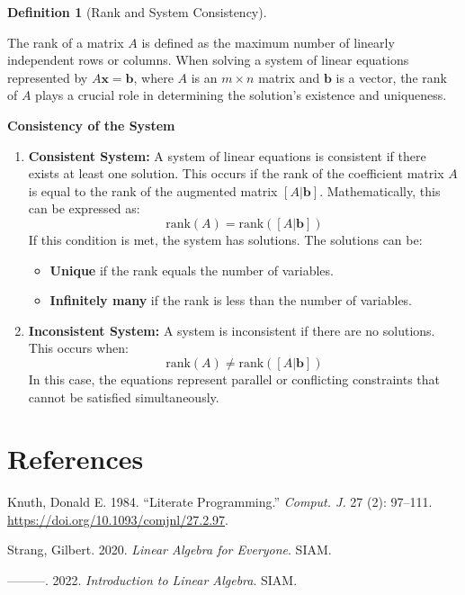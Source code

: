 \documentclass[
  letterpaper,
  DIV=11,
  numbers=noendperiod]{scrreprt}
\providecommand{\tightlist}{%
  \setlength{\itemsep}{0pt}\setlength{\parskip}{0pt}}\usepackage{longtable,booktabs,array}
\newlength{\cslhangindent}
\newenvironment{CSLReferences}[2] %
 {\begin{list}{}{%
  \setlength{\itemindent}{0pt}
  \setlength{\leftmargin}{0pt}
  \setlength{\parsep}{0pt}
  \ifodd #1
   \setlength{\leftmargin}{\cslhangindent}
   \setlength{\itemindent}{-1\cslhangindent}
  \fi
  \setlength{\itemsep}{#2\baselineskip}}}
 {\end{list}}
\theoremstyle{plain}
\theoremstyle{definition}
\newtheorem{definition}{Definition}[chapter]
\theoremstyle{remark}
\begin{document}
\begin{definition}[Rank and System
Consistency]\protect\hypertarget{def-soln}{}\label{def-soln}

The rank of a matrix \(A\) is defined as the maximum number of linearly
independent rows or columns. When solving a system of linear equations
represented by \(A\mathbf{x} = \mathbf{b}\), where \(A\) is an
\(m \times n\) matrix and \(\mathbf{b}\) is a vector, the rank of \(A\)
plays a crucial role in determining the solution's existence and
uniqueness.

\textbf{Consistency of the System}

\begin{enumerate}
\def\labelenumi{\arabic{enumi}.}
\tightlist
\item
  \textbf{Consistent System:} A system of linear equations is consistent
  if there exists at least one solution. This occurs if the rank of the
  coefficient matrix \(A\) is equal to the rank of the augmented matrix
  \([A|\mathbf{b}]\). Mathematically, this can be expressed as:
  \[\text{rank}(A) = \text{rank}([A|\mathbf{b}])\] If this condition is
  met, the system has solutions. The solutions can be:

  \begin{itemize}
  \tightlist
  \item
    \textbf{Unique} if the rank equals the number of variables.
  \item
    \textbf{Infinitely many} if the rank is less than the number of
    variables.
  \end{itemize}
\item
  \textbf{Inconsistent System:} A system is inconsistent if there are no
  solutions. This occurs when:
  \[\text{rank}(A) \ne \text{rank}([A|\mathbf{b}])\] In this case, the
  equations represent parallel or conflicting constraints that cannot be
  satisfied simultaneously.
\end{enumerate}

\end{definition}


\chapter*{References}\label{references}


\label{refs}
\begin{CSLReferences}{1}{0}
Knuth, Donald E. 1984. {``Literate Programming.''} \emph{Comput. J.} 27
(2): 97--111. \url{https://doi.org/10.1093/comjnl/27.2.97}.

Strang, Gilbert. 2020. \emph{Linear Algebra for Everyone}. SIAM.

---------. 2022. \emph{Introduction to Linear Algebra}. SIAM.

\end{CSLReferences}
\end{document}
